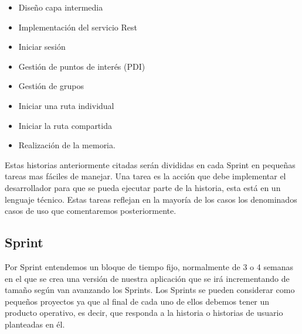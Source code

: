\begin{itemize}
\item Diseño capa intermedia
\item Implementación del servicio Rest
\item Iniciar sesión  
 \item Gestión de puntos de interés (PDI)
  \item Gestión de grupos
  \item Iniciar una ruta individual
   \item Iniciar la ruta compartida
   \item Realización de la memoria.
    
\end{itemize}
 Estas historias anteriormente citadas serán divididas en cada Sprint en pequeñas tareas mas fáciles de manejar. Una tarea es la acción que debe implementar el desarrollador para que se pueda ejecutar parte de la historia, esta está en un lenguaje técnico. Estas tareas reflejan en la mayoría de los casos los denominados casos de uso que comentaremos posteriormente.

\subsection{Sprint}

Por Sprint entendemos un bloque de tiempo fijo, normalmente de 3 o 4 semanas en el que
se crea una versión de nuestra aplicación que se irá incrementando de tamaño
según van avanzando los Sprints. Los Sprints se pueden considerar como pequeños
proyectos ya que al final de cada uno de ellos debemos tener un producto
operativo, es decir, que responda a la historia o historias de usuario planteadas en él.




